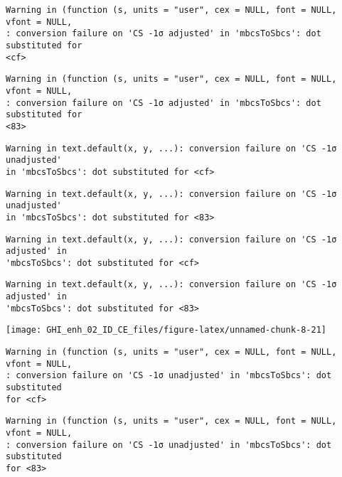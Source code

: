 \documentclass[
  10pt,
  a4paper,oneside]{article}
\begin{document}
\begin{verbatim}
Warning in (function (s, units = "user", cex = NULL, font = NULL, vfont = NULL,
: conversion failure on 'CS -1σ adjusted' in 'mbcsToSbcs': dot substituted for
<cf>
\end{verbatim}

\begin{verbatim}
Warning in (function (s, units = "user", cex = NULL, font = NULL, vfont = NULL,
: conversion failure on 'CS -1σ adjusted' in 'mbcsToSbcs': dot substituted for
<83>
\end{verbatim}

\begin{verbatim}
Warning in text.default(x, y, ...): conversion failure on 'CS -1σ unadjusted'
in 'mbcsToSbcs': dot substituted for <cf>
\end{verbatim}

\begin{verbatim}
Warning in text.default(x, y, ...): conversion failure on 'CS -1σ unadjusted'
in 'mbcsToSbcs': dot substituted for <83>
\end{verbatim}

\begin{verbatim}
Warning in text.default(x, y, ...): conversion failure on 'CS -1σ adjusted' in
'mbcsToSbcs': dot substituted for <cf>
\end{verbatim}

\begin{verbatim}
Warning in text.default(x, y, ...): conversion failure on 'CS -1σ adjusted' in
'mbcsToSbcs': dot substituted for <83>
\end{verbatim}

\begin{center}\texttt{[image: GHI\_enh\_02\_ID\_CE\_files/figure-latex/unnamed-chunk-8-21]} \end{center}

\begin{verbatim}
Warning in (function (s, units = "user", cex = NULL, font = NULL, vfont = NULL,
: conversion failure on 'CS -1σ unadjusted' in 'mbcsToSbcs': dot substituted
for <cf>
\end{verbatim}

\begin{verbatim}
Warning in (function (s, units = "user", cex = NULL, font = NULL, vfont = NULL,
: conversion failure on 'CS -1σ unadjusted' in 'mbcsToSbcs': dot substituted
for <83>
\end{verbatim}
\end{document}

